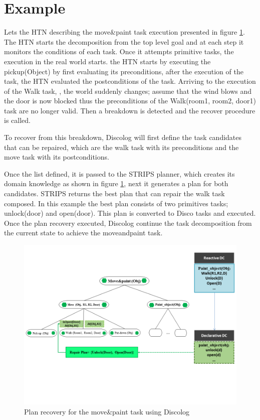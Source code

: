 \section{Example}

Lets the HTN describing the move\&paint task execution presented in figure \ref{Plan recovery}. The HTN starts the decomposition from the top level goal and at each step it monitors the conditions of each task. Once it attempts primitive tasks, the execution in the real world starts. the HTN starts by executing the pickup(Object) by first evaluating its preconditions, after the execution of the task, the HTN evaluated the postconditions of the task. Arriving to the execution of the Walk task, , the world suddenly changes; assume that the wind blows and the door is now blocked thus the preconditions of the Walk(room1, room2, door1) task are no longer valid. Then a breakdown is detected and the recover procedure is called.


To recover from this breakdown, Discolog will first define the task candidates that can be repaired, which are the walk task with its preconditions and the move task with its postconditions. 

Once the list defined, it is passed to the STRIPS planner, which creates its domain knowledge as shown in figure \ref{Plan recovery}, next it generates a plan for both candidates. STRIPS returns the best plan that can repair the walk task composed. In this example the best plan consists of two primitives tasks; unlock(door) and open(door). 
This plan is converted to Disco tasks and executed. Once the plan recovery executed, Discolog continue the task decomposition from the current state to achieve the moveandpaint task. 

		\begin{figure}[h]
			\centering
			\includegraphics[width=.75\columnwidth]{Pictures/repair.png}
			\caption{\label{Plan recovery} Plan recovery for the move\&paint task using Discolog}
		\end{figure}
		
